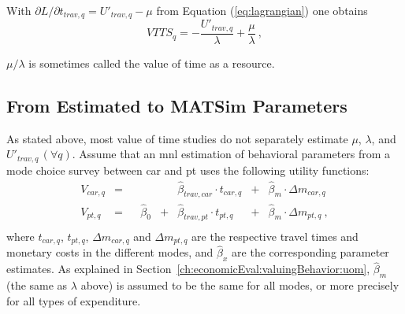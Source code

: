 With $\partial L / \partial t_{trav,q} = U'_{trav,q} - \mu$ from Equation (\ref{eq:lagrangian}) one obtains
\begin{equation}
VTTS_q 
= - \frac{U'_{trav,q}}{\lambda} + \frac{\mu}{\lambda} \ ,
\label{eq:vot2}
\end{equation}

$\mu/\lambda$ is sometimes called the value of time as a resource.




\subsection{From Estimated to MATSim Parameters}
\label{ch:economicEval:valuingBehavior:estimates2Matsim}

As stated above, most value of time studies do not separately estimate $\mu$, $\lambda$, and $U'_{trav,q} \, (\forall q)$. 
%
Assume that an \gls{mnl} estimation of behavioral parameters from a mode choice survey between car and \gls{pt} uses the following utility functions:
%
\begin{equation}
\begin{matrix}
V_{car,q} & =
&   &
&   & \hat{\beta}_{trav,car} \cdot t_{car,q}
& + & \hat{\beta}_{m} \cdot  \Delta{m_{car,q}} \\
%
V_{pt,q} & = 
&   & \hat{\beta}_{0}
& + & \hat{\beta}_{trav,pt} \cdot t_{pt,q}
& + & \hat{\beta}_{m} \cdot  \Delta{m_{pt,q}}  \ , \\
\end{matrix}
\label{eq:ch:economicEval:utilityTraveling}
\end{equation}
%
where $t_{car,q}$, $t_{pt,q}$, $\Delta{m_{car,q}}$ and $\Delta{m_{pt,q}}$  are the respective travel times and monetary costs in the different modes, and $\hat\beta_x$ are the corresponding parameter estimates.
%
As explained in Section~\ref{ch:economicEval:valuingBehavior:uom}, $\hat\beta_m$ (the same as $\lambda$ above) is assumed to be the same for all modes, or more precisely for all types of expenditure.

